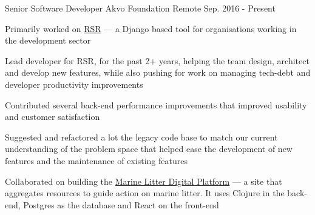 

\begin{cventries}

  \cventry
      {Senior Software Developer} %
      {Akvo Foundation } %
      {Remote} %
      {Sep. 2016 - Present} %
      {
        \begin{cvitems} %
        \item {Primarily worked on \href{https://github.com/akvo/akvo-rsr}{RSR} --- a Django based tool for organisations working in the development sector}
        \item {Lead developer for RSR, for the past 2+ years, helping the team design, architect and develop new features, while also pushing for work on managing tech-debt and developer productivity improvements}
        \item {Contributed several back-end performance improvements that improved usability and customer satisfaction}
        \item {Suggested and refactored a lot the legacy code base to match our current understanding of the problem space that helped ease the development of new features and the maintenance of existing features}
        \item {Collaborated on building the \href{https://digital.gpmarinelitter.org/}{Marine Litter Digital Platform} --- a site that aggregates resources to guide action on marine litter. It uses Clojure in the back-end, Postgres as the database and React on the front-end}
        \end{cvitems}
      }


\end{cventries}
